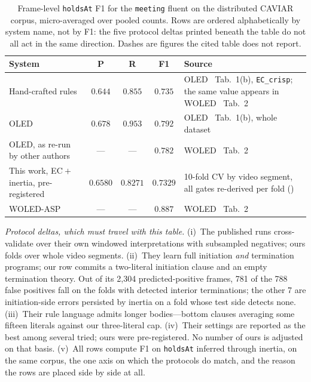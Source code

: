 \begin{table}[htbp]
  \centering
  \caption{Frame-level \texttt{holdsAt} F1 for the \texttt{meeting} fluent on the distributed CAVIAR corpus, micro-averaged over pooled counts. Rows are ordered alphabetically by system name, not by F1: the five protocol deltas printed beneath the table do not all act in the same direction. Dashes are figures the cited table does not report.}
  \label{tab:ec-published}
  \small
  \begin{tabularx}{\linewidth}{@{}l c c c L@{}}
    \toprule
    \textbf{System} & \textbf{P} & \textbf{R} & \textbf{F1} & \textbf{Source} \\
    \midrule
    Hand-crafted rules                      & $0.644$  & $0.855$  & $0.735$  & OLED~\cite{oled} Tab.~1(b), \texttt{EC\_crisp}; the same value appears in WOLED~\cite{woled} Tab.~2 \\
    OLED                                    & $0.678$  & $0.953$  & $0.792$  & OLED~\cite{oled} Tab.~1(b), whole dataset \\
    OLED, as re-run by other authors        & ---      & ---      & $0.782$  & WOLED~\cite{woled} Tab.~2 \\
    This work, EC${}+{}$inertia, pre-registered & $0.6580$ & $0.8271$ & $0.7329$ & 10-fold CV by video segment, all gates re-derived per fold () \\
    WOLED-ASP                               & ---      & ---      & $0.887$  & WOLED~\cite{woled} Tab.~2 \\
    \bottomrule
  \end{tabularx}

  \vspace{0.5em}
  {\footnotesize\raggedright
  \emph{Protocol deltas, which must travel with this table.}
  (i)~The published runs cross-validate over their own windowed interpretations with subsampled negatives; ours folds over whole video segments.
  (ii)~They learn full initiation \emph{and} termination programs; our row commits a two-literal initiation clause and an empty termination theory. Out of its 2{,}304 predicted-positive frames, 781 of the 788 false positives fall on the folds with detected interior terminations; the other 7 are initiation-side errors persisted by inertia on a fold whose test side detects none.
  (iii)~Their rule language admits longer bodies---bottom clauses averaging some fifteen literals against our three-literal cap.
  (iv)~Their settings are reported as the best among several tried; ours were pre-registered. No number of ours is adjusted on that basis.
  (v)~All rows compute F1 on \texttt{holdsAt} inferred through inertia, on the same corpus, the one axis on which the protocols do match, and the reason the rows are placed side by side at all.
  \par}
\end{table}

